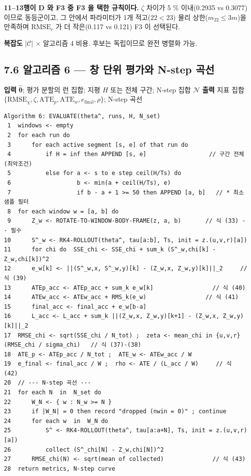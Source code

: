 \documentclass[10pt,a4paper]{article}
\begin{document}
\textbf{11--13행이 D 와 F3 중 F3 을 택한 규칙이다.} $\zeta$ 차이가 5 \% 이내(0.2935 vs 0.3077) 이므로 동등군이고, 그 안에서 파라미터가 1개 적고($22 < 23$) 물리 상한($m_{22} \le 3m$)을 만족하며 $\mathrm{RMSE}_r$ 가 더 작은(0.117 vs 0.121) F3 이 선택된다.

\textbf{복잡도} $|\mathcal{C}|$ $\times$ 알고리즘 4 비용. 후보는 독립이므로 완전 병렬화 가능.

\subsection*{7.6 알고리즘 6 --- 창 단위 평가와 N-step 곡선}

\textbf{입력} $\hat{\boldsymbol{\theta}}$; 평가 분할의 런 집합; 지평 $H$ 또는 전체 구간; N-step 집합 $\mathcal{N}$ \textbf{출력} 지표 집합 $\{\mathrm{RMSE}_\chi, \zeta, \mathrm{ATE}_p, \mathrm{ATE}_w, e_{\text{final}}, \rho\}$; N-step 곡선

\begin{Verbatim}[fontsize=\scriptsize,frame=single,framesep=2.2mm,rulecolor=\color{black!35}]
Algorithm 6: EVALUATE(theta^, runs, H, N_set)
 1  windows <- empty
 2  for each run do
 3      for each active segment [s, e] of that run do
 4          if H = inf then APPEND [s, e]                  // 구간 전체 (최악조건)
 5          else for a <- s to e step ceil(H/Ts) do
 6                   b <- min(a + ceil(H/Ts), e)
 7                   if b - a + 1 >= 50 then APPEND [a, b]   // * 최소 샘플 필터
 8  for each window w = [a, b] do
 9      Z_w <- ROTATE-TO-WINDOW-BODY-FRAME(z, a, b)       // 식 (33) -- 필수
10      S^_w <- RK4-ROLLOUT(theta^, tau[a:b], Ts, init = z.(u,v,r)[a])
11      for chi do  SSE_chi <- SSE_chi + sum_k (S^_w,chi[k] - Z_w,chi[k])^2
12      e_w[k] <- ||(S^_w,x, S^_w,y)[k] - (Z_w,x, Z_w,y)[k]||_2     // 식 (39)
13      ATEp_acc <- ATEp_acc + sum_k e_w[k]                 // 식 (40)
14      ATEw_acc <- ATEw_acc + RMS_k(e_w)                 // 식 (41)
15      final_acc <- final_acc + e_w[b-a]
16      L_acc <- L_acc + sum_k ||(Z_w,x, Z_w,y)[k+1] - (Z_w,x, Z_w,y)[k]||_2
17  RMSE_chi <- sqrt(SSE_chi / N_tot) ;  zeta <- mean_chi in {u,v,r}(RMSE_chi / sigma_chi)   // 식 (37)-(38)
18  ATE_p <- ATEp_acc / N_tot ;  ATE_w <- ATEw_acc / W
19  e_final <- final_acc / W ;  rho <- ATE / (L_acc / W)     // 식 (42)
20  // --- N-step 곡선 ---
21  for each N  in  N_set do
22      W_N <- { w : N_w >= N }
23      if |W_N| = 0 then record "dropped (nwin = 0)" ; continue
24      for each w  in  W_N do
25          S^ <- RK4-ROLLOUT(theta^, tau[a:a+N], Ts, init = z.(u,v,r)[a])
26          collect (S^_chi[N] - Z_w,chi[N])^2
27      RMSE_chi(N) <- sqrt(mean of collected)              // 식 (43)
28  return metrics, N-step curve
\end{Verbatim}
\end{document}
